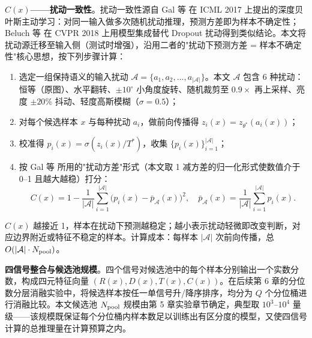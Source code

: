 \documentclass[UTF8,openany,12pt]{ctexbook}
\begin{document}
\textbf{$C(x)$——扰动一致性}。扰动一致性源自 Gal 等\cite{gal2017deep} 在 ICML 2017 上提出的深度贝叶斯主动学习：对同一输入做多次随机扰动推理，预测方差即为样本不确定性；Beluch 等\cite{beluch2018power} 在 CVPR 2018 上用模型集成替代 Dropout 扰动得到类似结论。本文将扰动源迁移至输入侧（测试时增强），沿用二者的"扰动下预测方差 = 样本不确定性"核心思想，按下列步骤计算：
\begin{enumerate}[leftmargin=2em,nosep]
\item 选定一组保持语义的输入扰动 $\mathcal{A} = \{a_1, a_2, \ldots, a_{|\mathcal{A}|}\}$。本文 $\mathcal{A}$ 包含 6 种扰动：恒等（原图）、水平翻转、$\pm 10^{\circ}$ 小角度旋转、随机裁剪至 $0.9\times$ 再上采样、亮度 $\pm 20\%$ 抖动、轻度高斯模糊（$\sigma = 0.5$）；
\item 对每个候选样本 $x$ 与每种扰动 $a_i$，做前向传播得 $z_i(x) = z_{\theta^{\ast}}(a_i(x))$；
\item 校准得 $p_i(x) = \sigma(z_i(x)/T^{\ast})$，收集 $\{p_i(x)\}_{i=1}^{|\mathcal{A}|}$；
\item 按 Gal 等\cite{gal2017deep} 所用的"扰动方差"形式（本文取 1 减方差的归一化形式使数值介于 0--1 且越大越稳）打分：
\begin{equation}
C(x) = 1 - \frac{1}{|\mathcal{A}|}\sum_{i=1}^{|\mathcal{A}|}\bigl(p_i(x) - \bar{p}_{\mathcal{A}}(x)\bigr)^2, \quad
\bar{p}_{\mathcal{A}}(x) = \frac{1}{|\mathcal{A}|}\sum_{i=1}^{|\mathcal{A}|} p_i(x).
\label{eq:C-implement}
\end{equation}
\end{enumerate}
$C(x)$ 越接近 1，样本在扰动下预测越稳定；越小表示扰动轻微即改变判断，对应边界附近或特征不稳定的样本。计算成本：每样本 $|\mathcal{A}|$ 次前向传播，总 $O(|\mathcal{A}| \cdot N_{\rm pool})$。

\textbf{四信号整合与候选池规模}。四个信号对候选池中的每个样本分别输出一个实数分数，构成四元特征向量 $(R(x), D(x), T(x), C(x))$。在后续第 6 章的分位数分层消融实验中，将候选样本按任一单信号升/降序排序，均分为 $Q$ 个分位桶进行消融比较。本文候选池 $N_{\rm pool}$ 规模由第 5 章实验章节确定，典型取 $10^3$--$10^4$ 量级——该规模既保证每个分位桶内样本数足以训练出有区分度的模型，又使四信号计算的总推理量在计算预算之内。
\end{document}
